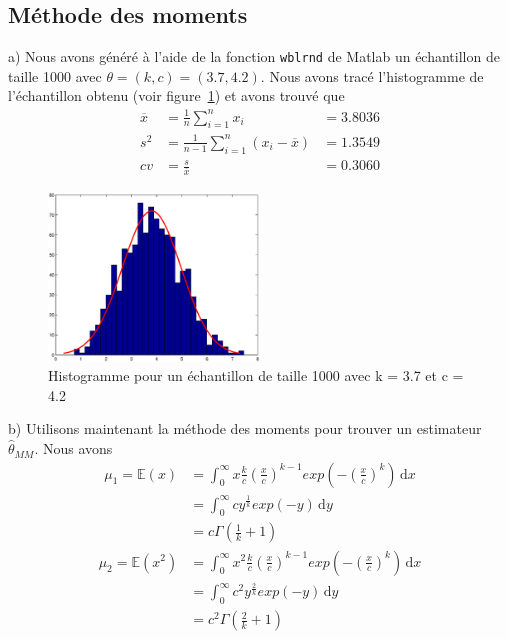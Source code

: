 \subsection{Méthode des moments}

a) Nous avons généré à l’aide de la fonction \texttt{wblrnd} de Matlab un échantillon de taille 1000 avec $\theta = (k,c) = (3.7,4.2)$. Nous avons tracé l'histogramme de l’échantillon obtenu (voir figure~\ref{fig:histo1}) et avons trouvé que 
\begin{align*}
\overline{x} &= \frac{1}{n}\sum\limits_{i=1}^n x_i &= 3.8036\\
s^2 &= \frac{1}{n-1}\sum\limits_{i=1}^n(x_i-\overline{x}) &= 1.3549\\
cv &= \frac{s}{\overline{x}} &= 0.3060
\end{align*}

\begin{figure}[!ht]
        \centering
        \includegraphics[width=0.5\textwidth]{graphes/histo1.eps}
        \caption{Histogramme pour un échantillon de taille 1000 avec k = 3.7 et c = 4.2}\label{fig:histo1}
\end{figure}

b)  Utilisons maintenant la méthode des moments pour trouver un estimateur $\hat\theta_{MM}$. Nous avons
\begin{align*}
\mu_1 = \mathbb{E}(x) &= \int_0^\infty \! x \frac{k}{c} \left(\frac{x}{c}\right)^{k-1} exp\left(-\left(\frac{x}{c}\right)^k\right) \, \mathrm{d}x\\
&= \int_0^\infty \! c y^{\frac{1}{k}} exp(-y) \, \mathrm{d}y\\
&= c\Gamma\left(\frac{1}{k}+1\right)
\end{align*}
\begin{align*}
\mu_2 = \mathbb{E}(x^2) &= \int_0^\infty \! x^2 \frac{k}{c} \left(\frac{x}{c}\right)^{k-1} exp\left(-\left(\frac{x}{c}\right)^k\right) \, \mathrm{d}x\\
&= \int_0^\infty \! c^2 y^{\frac{2}{k}} exp(-y) \, \mathrm{d}y\\
&= c^2\Gamma\left(\frac{2}{k}+1\right)
\end{align*}

